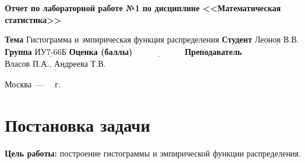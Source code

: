 \documentclass[12pt]{report}
\begin{document}
\begin{titlepage}
		\begin{center}
			\noindent\begin{minipage}{1.1\textwidth}\centering
				\Large\textbf{Отчет по лабораторной работе №1}\newline
				\textbf{по дисциплине <<Математическая статистика>>}\newline
			\end{minipage}
		\end{center}
		
		\noindent\textbf{Тема} $\underline{\text{Гистограмма и эмпирическая функция распределения}}$\newline\newline
		\noindent\textbf{Студент} $\underline{\text{Леонов В.В.}}$\newline\newline
		\noindent\textbf{Группа} $\underline{\text{ИУ7-66Б}}$\newline\newline
		\noindent\textbf{Оценка (баллы)} $\underline{\text{~~~~~~~~~~~~~~~~~}}$\newline\newline
		\noindent\textbf{Преподаватель} $\underline{\text{Власов П.А., Андреева Т.В.}}$\newline\newline\newline
		
		\begin{center}
			\vfill
			Москва~---~\the\year
			~г.
		\end{center}
	\end{titlepage}
	
\chapter*{Постановка задачи}

\textbf{Цель работы:} построение гистограммы и эмпирической функции распределения.
\end{document}
